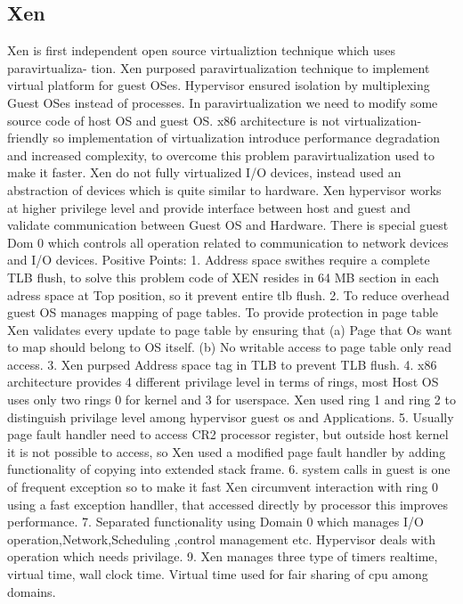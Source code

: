 \documentclass[seminar,twoside]{iitbreport}
\begin{document}
\subsection{Xen}
Xen is first independent open source virtualiztion technique which uses paravirtualiza-
tion. Xen purposed paravirtualization technique to implement virtual platform for guest
OSes. Hypervisor ensured isolation by multiplexing Guest OSes instead of processes.
In paravirtualization we need to modify some source code of host OS and guest
OS. x86 architecture is not virtualization-friendly 
so implementation of virtualization introduce performance degradation and increased complexity, 
to overcome this problem paravirtualization used to make it faster. 
Xen do not fully virtualized I/O devices, instead used an abstraction of devices which is quite similar to hardware. 
Xen hypervisor works at higher privilege level and provide interface between host and guest and 
validate communication between Guest OS and Hardware. There is special guest Dom 0 which controls all operation 
related to communication to network devices and I/O devices. 
Positive Points:
1. Address space swithes require a complete TLB flush, to solve this problem code of XEN resides in 64 MB section in each adress space at Top position, 
so it prevent entire tlb flush.
2. To reduce overhead guest OS manages mapping of page tables.
To provide protection in page table Xen validates every update to page table by ensuring that (a) Page that Os want to map should belong to OS itself.
(b) No writable access to page table only read access.
3. Xen purpsed Address space tag in TLB to prevent TLB flush.
4. x86 architecture provides 4 different privilage level in terms of rings, 
most Host OS uses only two rings 0 for kernel and 3 for userspace. 
Xen used ring 1 and ring 2 to distinguish privilage level among hypervisor guest os and Applications.
5. Usually page fault handler need to access CR2 processor register, 
but outside host kernel it is not possible to access, so Xen used a modified page fault handler 
by adding functionality of copying into extended stack frame.
6. system calls in guest is one of frequent exception so to make it fast 
Xen circumvent interaction with ring 0 using a fast exception handller, that accessed directly by processor this improves performance.
7. Separated functionality using Domain 0 which manages I/O operation,Network,Scheduling ,control management etc.
Hypervisor deals with operation which needs privilage.
9. Xen manages three type of timers realtime, virtual time, wall clock time.
Virtual time used for fair sharing of cpu among domains.
\end{document}

